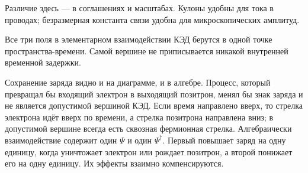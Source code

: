 Различие здесь — в соглашениях и масштабах. Кулоны удобны для тока в проводах; безразмерная константа связи удобна для микроскопических амплитуд.

Все три поля в элементарном взаимодействии КЭД берутся в одной точке пространства-времени. Самой вершине не приписывается никакой внутренней временной задержки.

\begin{classroomqa}
\end{classroomqa}

\begin{classroomqa}
\end{classroomqa}

Сохранение заряда видно и на диаграмме, и в алгебре. Процесс, который превращал бы входящий электрон в выходящий позитрон, менял бы знак заряда и не является допустимой вершиной КЭД. Если время направлено вверх, то стрелка электрона идёт вверх по времени, а стрелка позитрона направлена вниз; в допустимой вершине всегда есть сквозная фермионная стрелка. Алгебраически взаимодействие содержит один \(\Psi\) и один \(\Psi^\dagger\). Первый повышает заряд на одну единицу, когда уничтожает электрон или рождает позитрон, а второй понижает его на одну единицу. Их эффекты взаимно компенсируются.

\begin{classroomqa}
\end{classroomqa}

